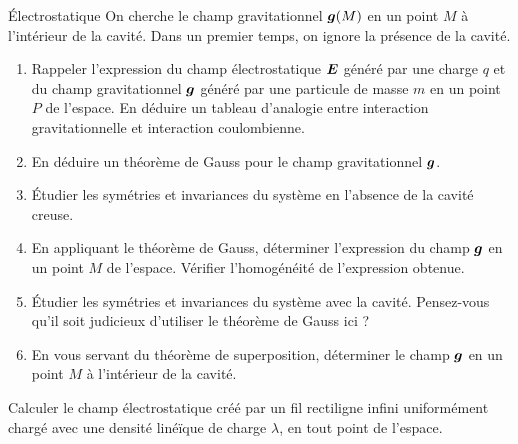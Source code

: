 \begin{td}{Électrostatique}
On cherche le champ gravitationnel $\vecg(M)$ en un point $M$ 
à l'intérieur de la cavité.
Dans un premier temps, on ignore la présence de la cavité.
\begin{enumerate}
	\item Rappeler l'expression du champ électrostatique $\vece$ généré par une
	  charge $q$ et du champ gravitationnel $\vecg$ généré par une particule
	  de masse $m$ en un point $P$ de l'espace. 
	  En déduire un tableau d'analogie entre interaction
	  gravitationnelle et interaction coulombienne.
  	\item En déduire un théorème de Gauss pour le champ gravitationnel
	  $\vecg$.
	\item Étudier les symétries et invariances du système en l'absence de
	  la cavité creuse.
	\item En appliquant le théorème de Gauss, déterminer l'expression
	  du champ $\vecg$ en un point $M$ de l'espace.
	  Vérifier l'homogénéité de l'expression obtenue.
	\item Étudier les symétries et invariances du système avec la cavité.
	  Pensez-vous qu'il soit judicieux d'utiliser le théorème de Gauss
	  ici ?
	\item En vous servant du théorème de superposition, 
	  déterminer le champ $\vecg$ en un point $M$ à l'intérieur de la cavité.
\end{enumerate}

	Calculer le champ électrostatique créé par un fil rectiligne infini
	uniformément chargé avec une densité linéïque de charge $\lambda$, en 
	tout point de l'espace.

\end{td}

